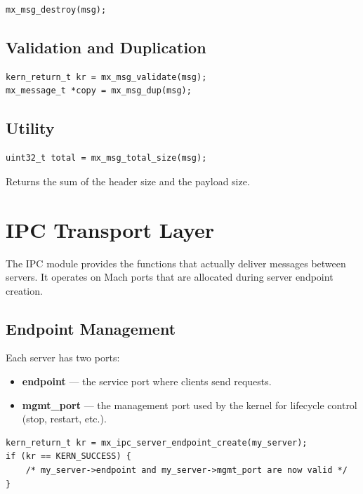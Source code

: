 \documentclass[a4paper,11pt]{article}
\begin{document}
\begin{lstlisting}
mx_msg_destroy(msg);
\end{lstlisting}

\subsection{Validation and Duplication}

\begin{lstlisting}
kern_return_t kr = mx_msg_validate(msg);
mx_message_t *copy = mx_msg_dup(msg);
\end{lstlisting}

\subsection{Utility}

\begin{lstlisting}
uint32_t total = mx_msg_total_size(msg);
\end{lstlisting}

Returns the sum of the header size and the payload size.

\section{IPC Transport Layer}

The IPC module provides the functions that actually deliver messages
between servers. It operates on Mach ports that are allocated during
server endpoint creation.

\subsection{Endpoint Management}

Each server has two ports:
\begin{itemize}
  \item \textbf{endpoint} --- the service port where clients send
    requests.
  \item \textbf{mgmt\_port} --- the management port used by the
    kernel for lifecycle control (stop, restart, etc.).
\end{itemize}

\begin{lstlisting}
kern_return_t kr = mx_ipc_server_endpoint_create(my_server);
if (kr == KERN_SUCCESS) {
    /* my_server->endpoint and my_server->mgmt_port are now valid */
}
\end{lstlisting}
\end{document}
